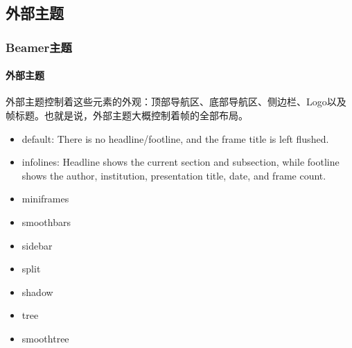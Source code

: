 \documentclass{beamer}
\begin{document}
\subsection{外部主题}
\begin{frame}
\frametitle{Beamer主题}
\framesubtitle{外部主题}
外部主题控制着这些元素的外观：顶部导航区、底部导航区、侧边栏、Logo以及帧标题。也就是说，外部主题大概控制着帧的全部布局。
\begin{itemize}
\item default: There is no headline/footline, and the frame title is left flushed.
\item infolines: Headline shows the current section and subsection, while footline shows the author, institution, presentation title, date, and frame count.
\item miniframes
\item smoothbars
\item sidebar
\item split
\item shadow
\item tree
\item smoothtree
\end{itemize}
\end{frame}
\end{document}
